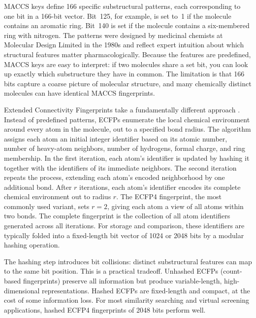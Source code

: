 MACCS keys define 166 specific substructural patterns, each corresponding to one bit in a 166-bit vector. Bit~125, for example, is set to~1 if the molecule contains an aromatic ring. Bit~140 is set if the molecule contains a six-membered ring with nitrogen. The patterns were designed by medicinal chemists at Molecular Design Limited in the 1980s and reflect expert intuition about which structural features matter pharmacologically. Because the features are predefined, MACCS keys are easy to interpret: if two molecules share a set bit, you can look up exactly which substructure they have in common. The limitation is that 166 bits capture a coarse picture of molecular structure, and many chemically distinct molecules can have identical MACCS fingerprints.

Extended Connectivity Fingerprints take a fundamentally different approach \cite{rogers2010}. Instead of predefined patterns, ECFPs enumerate the local chemical environment around every atom in the molecule, out to a specified bond radius. The algorithm assigns each atom an initial integer identifier based on its atomic number, number of heavy-atom neighbors, number of hydrogens, formal charge, and ring membership. In the first iteration, each atom's identifier is updated by hashing it together with the identifiers of its immediate neighbors. The second iteration repeats the process, extending each atom's encoded neighborhood by one additional bond. After $r$ iterations, each atom's identifier encodes its complete chemical environment out to radius $r$. The ECFP4 fingerprint, the most commonly used variant, sets $r = 2$, giving each atom a view of all atoms within two bonds. The complete fingerprint is the collection of all atom identifiers generated across all iterations. For storage and comparison, these identifiers are typically folded into a fixed-length bit vector of 1024 or 2048 bits by a modular hashing operation.

The hashing step introduces bit collisions: distinct substructural features can map to the same bit position. This is a practical tradeoff. Unhashed ECFPs (count-based fingerprints) preserve all information but produce variable-length, high-dimensional representations. Hashed ECFPs are fixed-length and compact, at the cost of some information loss. For most similarity searching and virtual screening applications, hashed ECFP4 fingerprints of 2048 bits perform well.


